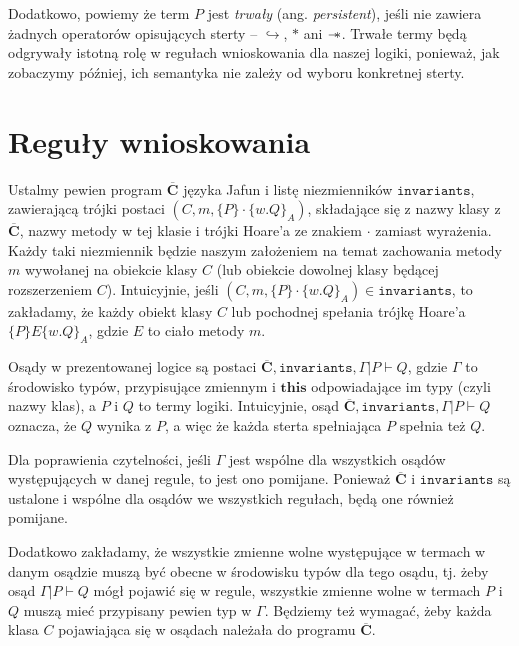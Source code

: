 \documentclass[]{pracamgr}
\newcommand \wand {\mathrel{-\mkern-6mu*}}
\newcommand \hoare [5] {\{#1\}#2\{#4.#5\}_#3}
\renewcommand \| {\hspace{0.75em} | \hspace{0.75em} }
\renewcommand \[ {[\![}
\renewcommand \] {]\!]}
\theoremstyle{definition}
\newcommand{\jthis}{\textbf{this}\xspace}
\begin{document}
Dodatkowo, powiemy że term $P$ jest \textit{trwały} (ang. \textit{persistent}),
jeśli nie zawiera żadnych operatorów opisujących sterty -- $\hookrightarrow$, $*$ ani $\wand$.
Trwałe termy będą odgrywały istotną rolę w regułach wnioskowania dla naszej logiki,
ponieważ, jak zobaczymy później, ich semantyka nie zależy od wyboru konkretnej sterty.

\chapter{Reguły wnioskowania}
\label{chap:rules}
Ustalmy pewien program \(\overline{\mathbf{C}}\) języka Jafun i
listę niezmienników $\mathtt{invariants}$, zawierającą trójki postaci
$(C, m, \hoare{P}{\cdot}{A}{w}{Q})$, składające się z nazwy klasy z \(\overline{\mathbf{C}}\),
nazwy metody w tej klasie i trójki Hoare'a ze znakiem $\cdot$ zamiast wyrażenia.
Każdy taki niezmiennik będzie naszym założeniem na temat zachowania metody $m$ wywołanej na
obiekcie klasy $C$ (lub obiekcie dowolnej klasy będącej rozszerzeniem $C$).
Intuicyjnie, jeśli $(C, m, \hoare{P}{\cdot}{A}{w}{Q}) \in \mathtt{invariants}$,
to zakładamy, że każdy obiekt klasy $C$ lub pochodnej spełania trójkę Hoare'a
$\hoare{P}{E}{A}{w}{Q}$, gdzie $E$ to ciało metody $m$.

Osądy w prezentowanej logice są postaci
$\overline{\mathbf{C}}, \mathtt{invariants}, \Gamma | P \vdash Q$, gdzie $\Gamma$ to środowisko typów,
przypisujące zmiennym i $\jthis$ odpowiadające im typy (czyli nazwy klas), a $P$ i $Q$ to termy logiki.
Intuicyjnie, osąd $\overline{\mathbf{C}}, \mathtt{invariants}, \Gamma | P \vdash Q$
oznacza, że $Q$ wynika z $P$, a więc że każda sterta spełniająca
$P$ spełnia też $Q$.

Dla poprawienia czytelności, jeśli $\Gamma$ jest wspólne dla wszystkich osądów występujących
w danej regule, to jest ono pomijane. Ponieważ $\overline{\mathbf{C}}$ i $\mathtt{invariants}$
są ustalone i wspólne dla osądów we wszystkich regułach, będą one również pomijane.

Dodatkowo zakładamy, że wszystkie zmienne wolne występujące w termach w danym osądzie muszą być
obecne w środowisku typów dla tego osądu, tj. żeby osąd $\Gamma | P \vdash Q$ mógł pojawić się
w regule, wszystkie zmienne wolne w termach $P$ i $Q$ muszą mieć przypisany pewien typ w $\Gamma$.
Będziemy też wymagać, żeby każda klasa $C$ pojawiająca się w osądach należała do programu
\(\overline{\mathbf{C}}\). 
\end{document}
